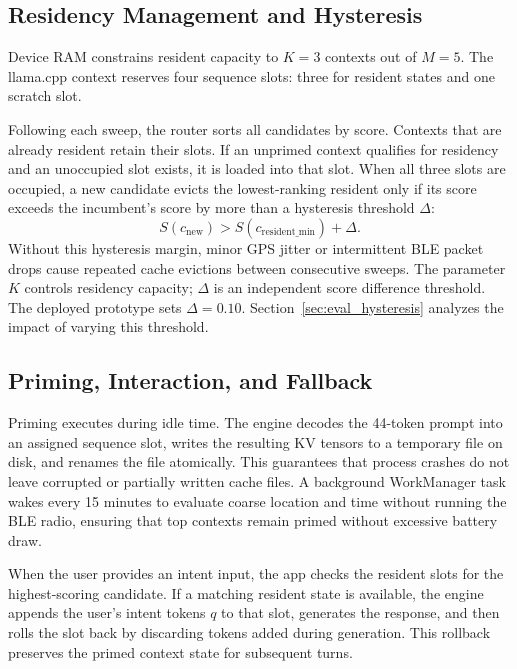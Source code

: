 \documentclass[conference]{IEEEtran}
\begin{document}
\subsection{Residency Management and Hysteresis}
\label{sec:residency}
Device RAM constrains resident capacity to $K=3$ contexts out of $M=5$. The llama.cpp context reserves four sequence slots: three for resident states and one scratch slot.

Following each sweep, the router sorts all candidates by score. Contexts that are already resident retain their slots. If an unprimed context qualifies for residency and an unoccupied slot exists, it is loaded into that slot. When all three slots are occupied, a new candidate evicts the lowest-ranking resident only if its score exceeds the incumbent's score by more than a hysteresis threshold $\Delta$:
\begin{equation}
S(c_{\mathrm{new}}) > S(c_{\mathrm{resident\_min}}) + \Delta.
\end{equation}
Without this hysteresis margin, minor GPS jitter or intermittent BLE packet drops cause repeated cache evictions between consecutive sweeps. The parameter $K$ controls residency capacity; $\Delta$ is an independent score difference threshold. The deployed prototype sets $\Delta=0.10$. Section~\ref{sec:eval_hysteresis} analyzes the impact of varying this threshold.

\subsection{Priming, Interaction, and Fallback}
\label{sec:fallback}
Priming executes during idle time. The engine decodes the 44-token prompt into an assigned sequence slot, writes the resulting KV tensors to a temporary file on disk, and renames the file atomically. This guarantees that process crashes do not leave corrupted or partially written cache files. A background WorkManager task wakes every 15 minutes to evaluate coarse location and time without running the BLE radio, ensuring that top contexts remain primed without excessive battery draw.

When the user provides an intent input, the app checks the resident slots for the highest-scoring candidate. If a matching resident state is available, the engine appends the user's intent tokens $q$ to that slot, generates the response, and then rolls the slot back by discarding tokens added during generation. This rollback preserves the primed context state for subsequent turns.
\end{document}
